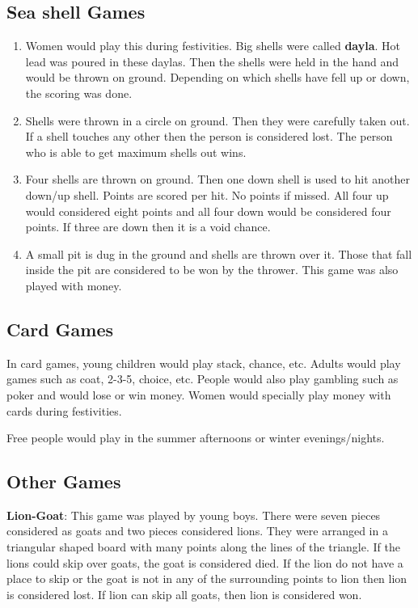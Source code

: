 \subsection{Sea shell Games} \begin{enumerate}

\item Women would play this during festivities. Big shells were called
\textbf{dayla}. Hot lead was poured in these daylas. Then the shells were held
in the hand and would be thrown on ground. Depending on which shells have fell
up or down, the scoring was done.

\item Shells were thrown in a circle on ground. Then they were carefully taken
out. If a shell touches any other then the person is considered lost. The
person who is able to get maximum shells out wins.

\item Four shells are thrown on ground. Then one down shell is used to hit
another down/up shell. Points are scored per hit. No points if missed. All four
up would considered eight points and all four down would be considered four
points. If three are down then it is a void chance.

\item A small pit is dug in the ground and shells are thrown over it. Those
that fall inside the pit are considered to be won by the thrower. This game was
also played with money.

\end{enumerate}

\subsection{Card Games}
In card games, young children would play stack, chance, etc. Adults would play
games such as coat, 2-3-5, choice, etc. People would also play gambling such as
poker and would lose or win money. Women would specially play money with cards
during festivities. 

Free people would play in the summer afternoons or winter evenings/nights.

\subsection{Other Games}

\textbf{Lion-Goat}: This game was played by young boys. There were seven pieces
considered as goats and two pieces considered lions. They were arranged in a
triangular shaped board with many points along the lines of the triangle. If
the lions could skip over goats, the goat is considered died. If the lion do
not have a place to skip or the goat is not in any of the surrounding points to
lion then lion is considered lost. If lion can skip all goats, then lion is
considered won. 

